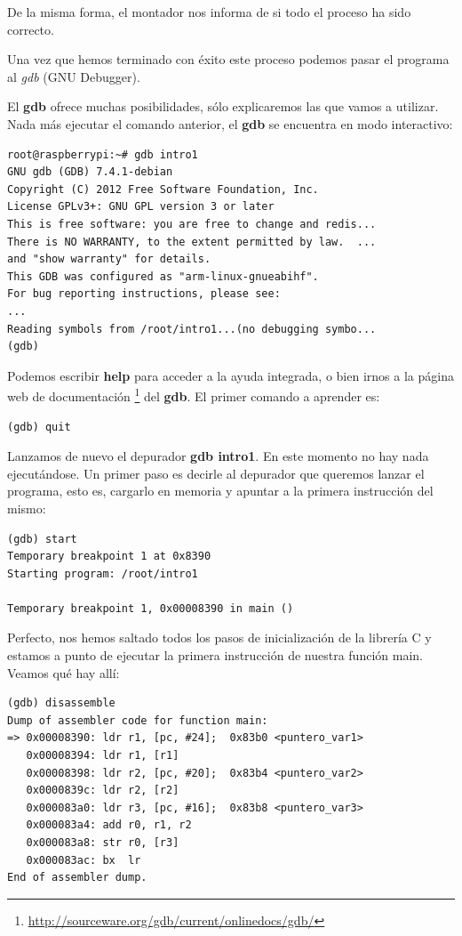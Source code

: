 \hspace{2.5cm}{\bf gcc -o intro1 intro1.o}

De la misma forma, el montador nos informa de si todo el proceso ha sido
correcto.

Una vez que hemos terminado con éxito este proceso podemos pasar el programa al
{\it gdb} (GNU Debugger).

\hspace{2.5cm}{\bf gdb intro1}

El {\bf gdb} ofrece muchas posibilidades, sólo explicaremos las que vamos
a utilizar. Nada más ejecutar el comando anterior, el {\bf gdb} se encuentra
en modo interactivo:

\begin{lstlisting}
root@raspberrypi:~# gdb intro1
GNU gdb (GDB) 7.4.1-debian
Copyright (C) 2012 Free Software Foundation, Inc.
License GPLv3+: GNU GPL version 3 or later 
This is free software: you are free to change and redis...
There is NO WARRANTY, to the extent permitted by law.  ...
and "show warranty" for details.
This GDB was configured as "arm-linux-gnueabihf".
For bug reporting instructions, please see:
...
Reading symbols from /root/intro1...(no debugging symbo...
(gdb)
\end{lstlisting}

Podemos escribir {\bf help} para acceder a la ayuda integrada, o bien
irnos a la página web de documentación
\footnote{\url{http://sourceware.org/gdb/current/onlinedocs/gdb/}}
del {\bf gdb}. El primer comando a aprender es:

\begin{lstlisting}
(gdb) quit
\end{lstlisting}

Lanzamos de nuevo el depurador {\bf gdb intro1}. En este momento no hay
nada ejecutándose. Un primer paso es decirle al depurador que queremos
lanzar el programa, esto es, cargarlo en memoria y apuntar a la primera
instrucción del mismo:

\begin{lstlisting}
(gdb) start
Temporary breakpoint 1 at 0x8390
Starting program: /root/intro1
 
Temporary breakpoint 1, 0x00008390 in main ()
\end{lstlisting}

Perfecto, nos hemos saltado todos los pasos de inicialización de la
librería C y estamos a punto de ejecutar la primera instrucción de
nuestra función main. Veamos qué hay allí:

\begin{lstlisting}
(gdb) disassemble
Dump of assembler code for function main:
=> 0x00008390: ldr r1, [pc, #24];  0x83b0 <puntero_var1>
   0x00008394: ldr r1, [r1]
   0x00008398: ldr r2, [pc, #20];  0x83b4 <puntero_var2>
   0x0000839c: ldr r2, [r2]
   0x000083a0: ldr r3, [pc, #16];  0x83b8 <puntero_var3>
   0x000083a4: add r0, r1, r2
   0x000083a8: str r0, [r3]
   0x000083ac: bx  lr
End of assembler dump.
\end{lstlisting}

